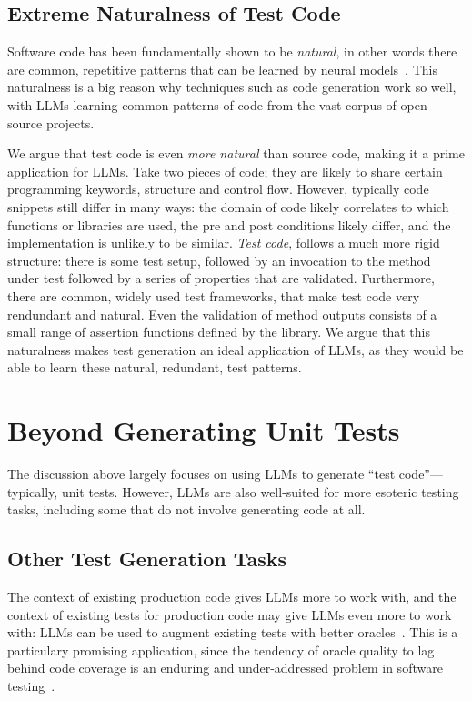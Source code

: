 \documentclass[sigconf,natbib=false]{acmart}
\begin{document}
\subsection{Extreme Naturalness of Test Code}

Software code has been fundamentally shown to be \emph{natural}, in other words there are common, repetitive patterns that can be 
learned by neural models~\cite{naturalnessofcode}. This naturalness is a big reason why techniques such as code generation work so well, with LLMs 
learning common patterns of code from the vast corpus of open source projects. 

We argue that test code is even \emph{more natural} than source code, making it a prime application for LLMs. Take two pieces of code; they are likely 
to share certain programming keywords, structure and control flow. However, typically code snippets still differ in many ways: the domain of code 
likely correlates to which functions or libraries are used, the pre and post conditions likely differ, and the implementation is unlikely to be similar.
\emph{Test code}, follows a much more rigid structure: there is some test setup, followed by an invocation to the method under test followed by a series of 
properties that are validated. Furthermore, there are common, widely used test frameworks, that make test code very rendundant and natural. Even the validation of 
method outputs consists of a small range of assertion functions defined by the library. We argue that this naturalness makes test generation an ideal application 
of LLMs, as they would be able to learn these natural, redundant, test patterns. 

\section{Beyond Generating Unit Tests}

The discussion above largely focuses on using LLMs to generate ``test
code''---typically, unit tests.  However, LLMs are also well-suited
for more esoteric testing tasks, including some that do not involve
generating code at all.

\subsection{Other Test Generation Tasks}

The context of existing production code gives LLMs more to work with,
and the context of existing tests for production code may give LLMs
even more to work with: LLMs can be used to augment existing tests
with better oracles~\cite{OracleGEN}.  This is a particulary promising
application, since the tendency of oracle quality to lag behind code coverage
is an enduring and under-addressed problem in software testing~\cite{MindGap}.
\end{document}

